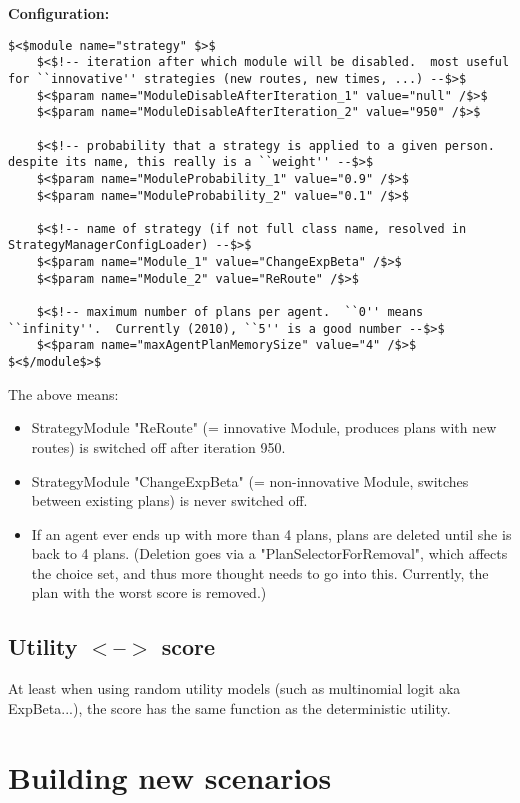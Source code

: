 \documentclass[a4paper,11pt]{report}
\begin{document}
\textbf{Configuration:}
\begin{verbatim}
$<$module name="strategy" $>$
	$<$!-- iteration after which module will be disabled.  most useful for ``innovative'' strategies (new routes, new times, ...) --$>$
	$<$param name="ModuleDisableAfterIteration_1" value="null" /$>$
	$<$param name="ModuleDisableAfterIteration_2" value="950" /$>$

	$<$!-- probability that a strategy is applied to a given person.  despite its name, this really is a ``weight'' --$>$
	$<$param name="ModuleProbability_1" value="0.9" /$>$
	$<$param name="ModuleProbability_2" value="0.1" /$>$

	$<$!-- name of strategy (if not full class name, resolved in StrategyManagerConfigLoader) --$>$
	$<$param name="Module_1" value="ChangeExpBeta" /$>$
	$<$param name="Module_2" value="ReRoute" /$>$

	$<$!-- maximum number of plans per agent.  ``0'' means ``infinity''.  Currently (2010), ``5'' is a good number --$>$
	$<$param name="maxAgentPlanMemorySize" value="4" /$>$
$<$/module$>$
\end{verbatim}

The above means:
\begin{itemize}
	\item StrategyModule "ReRoute" (= innovative Module, produces plans with new routes) is switched off after iteration 950.
	\item StrategyModule "ChangeExpBeta" (= non-innovative Module, switches between existing plans) is never switched off.
	\item If an agent ever ends up with more than 4 plans, plans are deleted  until she is back to 4 plans. (Deletion goes via a  "PlanSelectorForRemoval", which affects the choice set, and thus more  thought needs to go into this. Currently, the plan with the worst  score is removed.)
\end{itemize}

\vfill\eject
\section{Utility $<$--$>$ score}


At least when using random utility models (such as multinomial logit   aka ExpBeta...), the score has the same function as the deterministic   utility.

\chapter{Building new scenarios}
\end{document}
